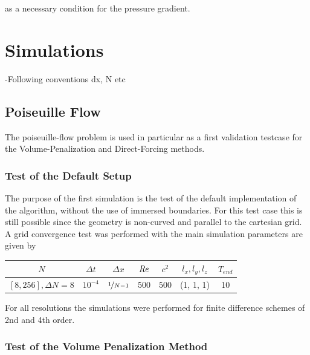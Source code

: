 as a necessary condition for the pressure gradient.\\

\clearpage


\section{Simulations}

-Following conventions dx, N etc


\subsection{Poiseuille Flow}

The poiseuille-flow problem  is used in particular as a first validation testcase
for the Volume-Penalization and Direct-Forcing methods.

\subsubsection{Test of the Default Setup}

The purpose of the first simulation is the test of the default
implementation of the algorithm, without the use of immersed boundaries.
For this test case this is still possible since the geometry is non-curved
and parallel to the cartesian grid.
A grid convergence test was performed with the main simulation parameters are given by

\begin{center}
\vspace*{0.7ex}
\begin{tabular}{c|c|c|c|c|c|c }
 $ N  $                   & $\Delta t$ & $\Delta x$            & $\mbox{\textit{Re}}$  & $c^2$   & $l_x, l_y, l_z$ & $T_{end}$\\
\hline
 $[8, 256], \Delta N = 8 $& $10^{-4}$ & $\nicefrac{1}{N - 1}$ & 500     & $500$   & (1, 1, 1)       & 10\\
\end{tabular}
\vspace*{0.7ex}
\end{center}

For all resolutions the simulations were performed for finite difference
schemes of 2nd and 4th order.

\subsubsection{Test of the Volume Penalization Method}

